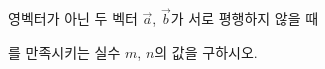 영벡터가 아닌 두 벡터 $\vec{a}$, $\vec{b}$가 서로 평행하지 않을 때 \par\smallskip{}\par\smallskip\noindent 를 만족시키는 실수 $m$, $n$의 값을 구하시오.
